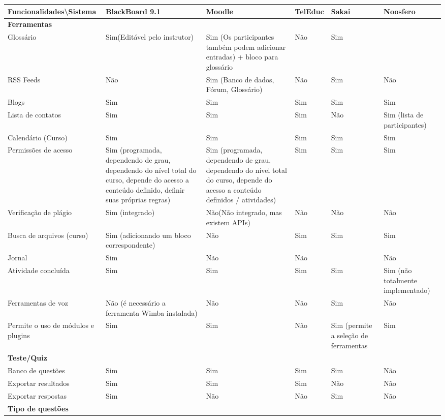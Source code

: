 \begin{table}[h]
\begin{tabular}{@{}p{5cm}|p{3.5cm}|p{3.5cm}|p{2.5cm}|p{2.5cm}|p{3.5cm}@{}}
\toprule
\textbf{Funcionalidades\textbackslash Sistema} & \textbf{BlackBoard 9.1} & \textbf{Moodle} & \textbf{TelEduc} & \textbf{Sakai} & \textbf{Noosfero}\\ \midrule
\textbf{Ferramentas} &  &  &  &  &  \\
Glossário & Sim(Editável pelo instrutor) & Sim (Os participantes também podem adicionar entradas) + bloco para glossário & Não & Sim &  \\
RSS Feeds & Não & Sim (Banco de dados, Fórum, Glossário) & Não & Sim & Não \\
Blogs & Sim & Sim & Sim & Sim & Sim \\
Lista de contatos & Sim & Sim & Sim & Não & Sim (lista de participantes) \\
Calendário (Curso) & Sim & Sim & Sim & Sim & Sim \\
Permissões de acesso & Sim (programada, dependendo de grau, dependendo do nível total do curso, depende do acesso a conteúdo definido, definir suas próprias regras) & Sim (programada, dependendo de grau, dependendo do nível total do curso, depende do acesso a conteúdo definidos / atividades) & Sim & Sim & Sim \\
Verificação de plágio & Sim (integrado) & Não(Não integrado, mas existem APIs) & Não & Não & Não \\
Busca de arquivos (curso) & Sim (adicionando um bloco correspondente) & Não & Sim & Sim & Sim \\
Jornal & Sim & Não & Não &  & Não \\
Atividade concluída & Sim & Sim & Sim & Sim & Sim (não totalmente implementado) \\
Ferramentas de voz & Não (é necessário a ferramenta Wimba instalada) & Não & Não & Sim & Não \\
Permite o uso de módulos e plugins & Sim & Sim & Não & Sim (permite a seleção de ferramentas & Sim \\
\textbf{Teste/Quiz} &  &  &  &  &  \\
Banco de questões & Sim & Sim & Sim & Sim & Não \\
Exportar resultados & Sim & Sim & Sim & Não & Não \\
Exportar respostas & Sim & Não & Não & Sim & Não \\
\textbf{Tipo de questões} &  &  &  &  &  \\

\end{tabular}
\end{table}

